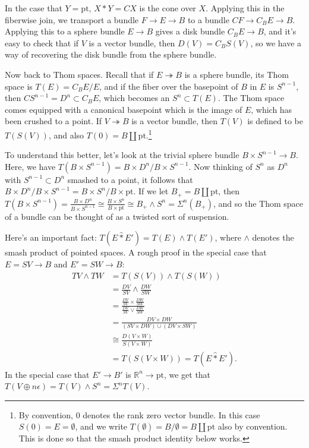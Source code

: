 \documentclass{article}
\newcommand{\R}{\mathbb{R}}
\newcommand{\sprod}{\wedge}
\newcommand{\wsum}{\vee}
\newcommand{\pt}[1]{#1_+}
\newcommand{\ptspace}{\mathrm{pt}}
\newcommand{\Suspend}{\Sigma}
\newcommand{\onto}{\twoheadrightarrow}
\begin{document}
In the case that $Y = \ptspace$, $X \ast Y = CX$ is the cone over $X$.  Applying this in the fiberwise join, we transport a bundle $F \to E \to B$ to a bundle $CF \to C_B E \to B$.  Applying this to a sphere bundle $E \to B$ gives a disk bundle $C_B E \to B$, and it's easy to check that if $V$ is a vector bundle, then $D(V) = C_B S(V)$, so we have a way of recovering the disk bundle from the sphere bundle.

Now back to Thom spaces.  Recall that if $E \onto B$ is a sphere bundle, its Thom space is $T(E) = C_B E / E$, and if the fiber over the basepoint of $B$ in $E$ is $S^{n-1}$, then $CS^{n-1} = D^n \subset C_B E$, which becomes an $S^n \subset T(E)$.  The Thom space comes equipped with a canonical basepoint which is the image of $E$, which has been crushed to a point.  If $V \onto B$ is a vector bundle, then $T(V)$ is defined to be $T(S(V))$, and also $T(0) = B \amalg \ptspace$.\footnote{By convention, $0$ denotes the rank zero vector bundle.  In this case $S(0) = E = \emptyset$, and we write $T(\emptyset) = B / \emptyset = B \amalg \ptspace$ also by convention.  This is done so that the smash product identity below works.}

To understand this better, let's look at the trivial sphere bundle $B \times S^{n-1} \to B$.  Here, we have $T(B \times S^{n-1}) = B \times D^n / B \times S^{n-1}$.  Now thinking of $S^n$ as $D^n$ with $S^{n-1} \subset D^n$ smashed to a point, it follows that $B \times D^n / B \times S^{n-1} = B \times S^n / B \times \ptspace$.  If we let $\pt{B} = B \amalg \ptspace$, then $T(B \times S^{n-1}) = \frac{B \times D^n}{B \times S^{n-1}} \cong \frac{B \times S^n}{B \times \ptspace} \cong \pt{B} \sprod S^n = \Suspend^n(\pt{B})$, and so the Thom space of a bundle can be thought of as a twisted sort of suspension.

Here's an important fact: $T(E \hat \ast E') = T(E) \sprod T(E')$, where $\sprod$ denotes the smash product of pointed spaces.  A rough proof in the special case that $E = SV \to B$ and $E' = SW \to B$:
\begin{align*}
TV \sprod TW & = T(S(V)) \sprod T(S(W)) \\
& = \frac{DV}{SV} \sprod \frac{DW}{SW} \\
& = \frac{\frac{DV}{SV} \times \frac{DW}{SW}}{\frac{DV}{SV} \wsum \frac{DW}{SW}} \\
& = \frac{DV \times DW}{(SV \times DW) \cup (DV \times SW)} \\
& \cong \frac{D(V \times W)}{S(V \times W)} \\
& = T(S(V \times W)) = T(E \hat \ast E').
\end{align*}
In the special case that $E' \to B'$ is $\R^n \to \ptspace$, we get that $T(V \oplus n \epsilon) = T(V) \sprod S^n = \Suspend^n T(V)$.
\end{document}
